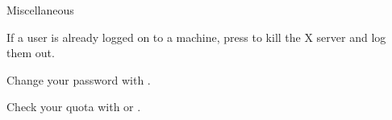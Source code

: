 \begin{block}{Miscellaneous}
  \begin{indented_itemize}
  \item If a user is already logged on to a machine, press  to kill the X server and log them out.
  \item Change your password with .
  \item Check your quota with  or .
  \end{indented_itemize}
\end{block}
